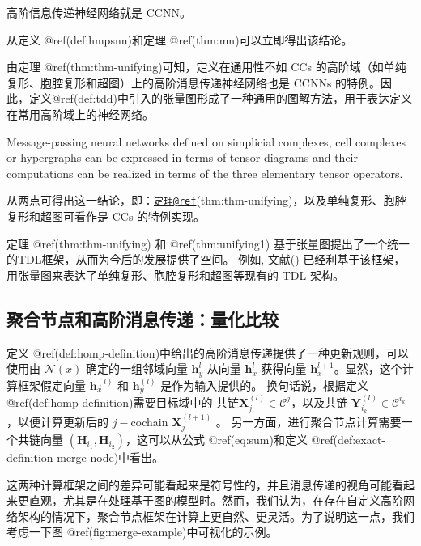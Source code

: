 \documentclass[
  12pt,
]{krantz}
\begin{document}
\label{thm-unifying}
高阶信息传递神经网络就是 CCNN。

从定义 @ref(def:hmpsnn)和定理 @ref(thm:mn)可以立即得出该结论。

由定理 @ref(thm:thm-unifying)可知，定义在通用性不如 CCs
的高阶域（如单纯复形、胞腔复形和超图）上的高阶消息传递神经网络也是 CCNNs
的特例。因此，定义@ref(def:tdd)中引入的张量图形成了一种通用的图解方法，用于表达定义在常用高阶域上的神经网络。

\label{unifying1}
Message-passing neural networks defined on simplicial complexes, cell
complexes or hypergraphs can be expressed in terms of tensor diagrams
and their computations can be realized in terms of the three elementary
tensor operators.

从两点可得出这一结论，即：\href{mailto:定理@ref}{\nolinkurl{定理@ref}}(thm:thm-unifying)，以及单纯复形、胞腔复形和超图可看作是
CCs 的特例实现。

定理 @ref(thm:thm-unifying) 和 @ref(thm:unifying1)
基于张量图提出了一个统一的TDL框架，从而为今后的发展提供了空间。 例如,
文献()
已经利基于该框架，用张量图来表达了单纯复形、胞腔复形和超图等现有的 TDL
架构。

\subsection{聚合节点和高阶消息传递：量化比较}\label{merge-nodes-and-higher-order-message-passing-a-qualitative-comparison}

定义
@ref(def:homp-definition)中给出的高阶消息传递提供了一种更新规则，可以使用由
\(\mathcal{N}(x)\) 确定的一组邻域向量 \(\mathbf{h}_y^{l}\) 从向量
\(\mathbf{h}_x^{l}\) 获得向量
\(\mathbf{h}_x^{l+1}\)。显然，这个计算框架假定向量
\(\mathbf{h}_x^{(l)}\) 和 \(\mathbf{h}_{y}^{(l)}\) 是作为输入提供的。
换句话说，根据定义 @ref(def:homp-definition)需要目标域中的
共链\(\mathbf{X}_j^{(l)} \in \mathcal{C}^{j}\)，以及共链
\(\mathbf{Y}_{i_k}^{(l)} \in \mathcal{C}^{i_k}\)，以便计算更新后的
\(j-\)cochain \(\mathbf{X}_j^{(l+1)}\) 。
另一方面，进行聚合节点计算需要一个共链向量
\((\mathbf{H}_{i_1},\mathbf{H}_{i_2})\)，这可以从公式 @ref(eq:sum)和定义
@ref(def:exact-definition-merge-node)中看出。

这两种计算框架之间的差异可能看起来是符号性的，并且消息传递的视角可能看起来更直观，尤其是在处理基于图的模型时。然而，我们认为，在存在自定义高阶网络架构的情况下，聚合节点框架在计算上更自然、更灵活。为了说明这一点，我们考虑一下图
@ref(fig:merge-example)中可视化的示例。
\end{document}
